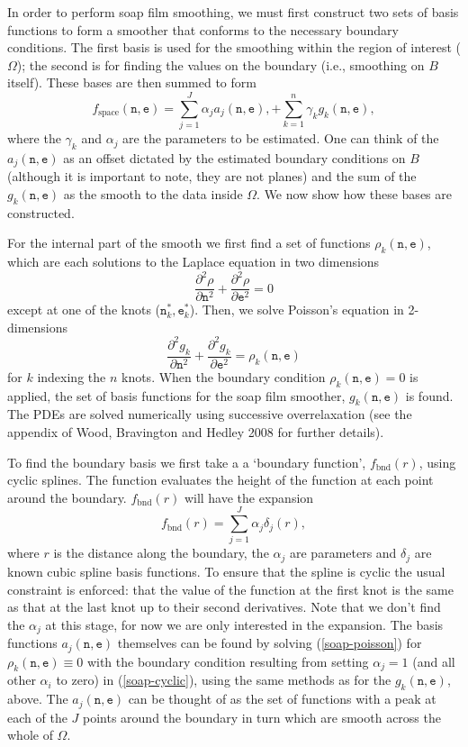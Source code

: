 \documentclass[10pt] {article}
\newcommand{\beq}{\begin{equation}}
\newcommand{\eeq}{\end{equation}}
\theoremstyle{definition}
\theoremstyle{plain}
\begin{document}
In order to perform soap film smoothing, we must first construct two sets of basis functions to form a smoother that conforms to the necessary boundary conditions. The first basis is used for the smoothing within the region of interest ($\Omega$); the second is for finding the values on the boundary (i.e., smoothing on $B$ itself). These bases are then summed to form
\beq
f_\text{space}(\texttt{n},\texttt{e})=\sum_{j=1}^J \alpha_j a_j(\texttt{n},\texttt{e}),+\sum_{k=1}^n \gamma_k g_k(\texttt{n},\texttt{e}),
\eeq
where the $\gamma_k$ and $\alpha_j$ are the parameters to be estimated. One can think of the $a_j(\texttt{n},\texttt{e})$ as an offset dictated by the estimated boundary conditions on $B$ (although it is important to note, they are not planes) and the sum of the $g_k(\texttt{n},\texttt{e})$ as the smooth to the data inside $\Omega$. We now show how these bases are constructed.

For the internal part of the smooth we first find a set of functions $\rho_k(\texttt{n},\texttt{e})$, which are each solutions to the Laplace equation in two dimensions
\beq
\frac{\partial^2\rho}{\partial \texttt{n}^2} + \frac{\partial^2\rho}{\partial \texttt{e}^2} = 0
\eeq
except at one of the knots ($\texttt{n}^*_k,\texttt{e}^*_k$). Then, we solve Poisson's equation in 2-dimensions
\beq
\frac{\partial^2 g_k}{\partial \texttt{n}^2} + \frac{\partial^2 g_k}{\partial \texttt{e}^2} = \rho_k(\texttt{n},\texttt{e})
\label{soap-poisson}
\eeq
for $k$ indexing the $n$ knots. When the boundary condition $\rho_k(\texttt{n},\texttt{e})=0$ is applied, the set of basis functions for the soap film smoother, $g_k(\texttt{n},\texttt{e})$ is found.  The PDEs are solved numerically using successive overrelaxation (see the appendix of Wood, Bravington and Hedley 2008 for further details).

To find the boundary basis we first take a a `boundary function', $f_\text{bnd}(r)$, using cyclic splines. The function evaluates the height of the function at each point around the boundary. $f_\text{bnd}(r)$ will have the expansion
\beq
f_\text{bnd}(r)=\sum_{j=1}^J \alpha_j \delta_j(r),
\label{soap-cyclic}
\eeq
where $r$ is the distance along the boundary, the $\alpha_j$ are parameters and $\delta_j$ are known cubic spline basis functions. To ensure that the spline is cyclic the usual constraint is enforced: that the value of the function at the first knot is the same as that at the last knot up to their second derivatives. Note that we don't find the $\alpha_j$ at this stage, for now we are only interested in the expansion. The basis functions $a_j(\texttt{n},\texttt{e})$ themselves can be found by solving (\ref{soap-poisson}) for $\rho_k(\texttt{n},\texttt{e})\equiv 0$ with the boundary condition resulting from setting $\alpha_j=1$ (and all other $\alpha_i$ to zero) in (\ref{soap-cyclic}), using the same methods as for the $g_k(\texttt{n},\texttt{e})$, above. The $a_j(\texttt{n},\texttt{e})$ can be thought of as the set of functions with a peak at each of the $J$ points around the boundary in turn which are smooth across the whole of $\Omega$.
\end{document}
